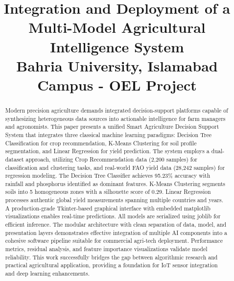 \documentclass[conference]{IEEEtran}
\begin{document}
\title{Integration and Deployment of a Multi-Model Agricultural Intelligence System\\
{\footnotesize Bahria University, Islamabad Campus - OEL Project}
}

\author{
}

\maketitle

\begin{abstract}
Modern precision agriculture demands integrated decision-support platforms capable of synthesizing heterogeneous data sources into actionable intelligence for farm managers and agronomists. This paper presents a unified Smart Agriculture Decision Support System that integrates three classical machine learning paradigms: Decision Tree Classification for crop recommendation, K-Means Clustering for soil profile segmentation, and Linear Regression for yield prediction. The system employs a dual-dataset approach, utilizing Crop Recommendation data (2,200 samples) for classification and clustering tasks, and real-world FAO yield data (28,242 samples) for regression modeling. The Decision Tree Classifier achieves 95.23\% accuracy with rainfall and phosphorus identified as dominant features. K-Means Clustering segments soils into 5 homogeneous zones with a silhouette score of 0.29. Linear Regression processes authentic global yield measurements spanning multiple countries and years. A production-grade Tkinter-based graphical interface with embedded matplotlib visualizations enables real-time predictions. All models are serialized using joblib for efficient inference. The modular architecture with clean separation of data, model, and presentation layers demonstrates effective integration of multiple AI components into a cohesive software pipeline suitable for commercial agri-tech deployment. Performance metrics, residual analysis, and feature importance visualizations validate model reliability. This work successfully bridges the gap between algorithmic research and practical agricultural application, providing a foundation for IoT sensor integration and deep learning enhancements.
\end{abstract}
\end{document}
